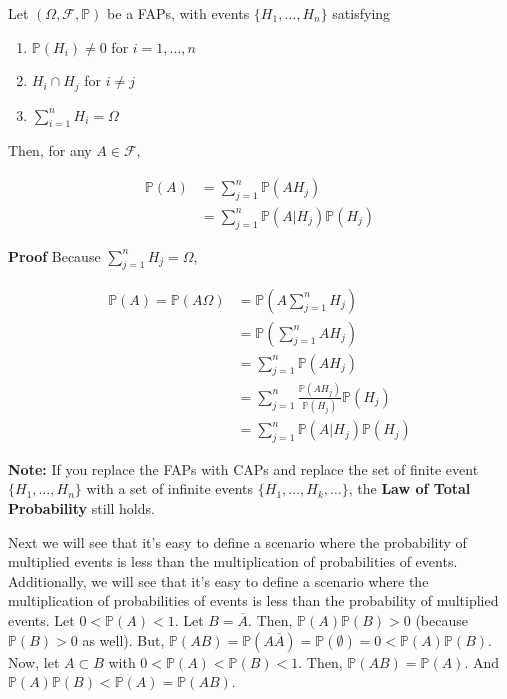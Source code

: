 \documentclass[12pt]{article}
\newcommand{\prob}[1]{\mathbb{P}(#1)}
\begin{document}
\noindent
Let $(\Omega, \mathcal{F}, \mathbb{P})$ be a FAPs, with events $\big \{ H_1, \ldots, H_n \big \}$ satisfying

\begin{enumerate}[label=(\roman*)]
\item $\prob{H_i} \neq 0$ for $i = 1, \ldots, n$
\item $H_i \cap H_j$ for $i \neq j$
\item $\sum_{i=1}^{n} H_i = \Omega$
\end{enumerate}


\noindent
Then, for any $A \in \mathcal{F}$, 

\begin{align*}
\prob{A} & = \sum_{j=1}^{n} \prob{A H_j} \\
& = \sum_{j=1}^{n} \prob{A \lvert H_j} \prob{H_j}
\end{align*}

\noindent
\textbf{Proof} Because $\sum_{j=1}^{n} H_j = \Omega$,

\begin{align*}
\prob{A} = \prob{A \Omega} &= \prob{A \sum_{j=1}^{n} H_j} \\
& = \prob{\sum_{j=1}^{n} AH_j} \\
&= \sum_{j=1}^{n} \prob{AH_j} \\
& = \sum_{j=1}^{n} \frac{\prob{AH_j}}{\prob{H_j}} \prob{H_j} \\
& =  \sum_{j=1}^{n} \prob{A \lvert H_j} \prob{H_j}
\end{align*}

\noindent
\textbf{Note:} If you replace the FAPs with CAPs and replace the set of finite event $\big \{ H_1, \ldots, H_n \big \}$ with a set of infinite events $\big \{ H_1, \ldots, H_k, \ldots \big \}$, the \textbf{Law of Total Probability} still holds.

\noindent
Next we will see that it's easy to define a scenario where the probability of multiplied events is less than the multiplication of probabilities of events. Additionally, we will see that it's easy to define a scenario where the multiplication of probabilities of events is less than the probability of multiplied events. Let $0 < \prob{A} < 1$. Let $B = \overline{A}$. Then, $\prob{A}\prob{B} > 0$ (because $\prob{B} > 0$ as well). But, $\prob{AB} = \prob{A \overline{A}} = \prob{\emptyset} = 0 < \prob{A}\prob{B}$. Now, let $A \subset B$ with $0 < \prob{A} < \prob{B} < 1$. Then, $\prob{AB} = \prob{A}$. And $\prob{A}\prob{B} < \prob{A} = \prob{AB}$. 
\end{document}
